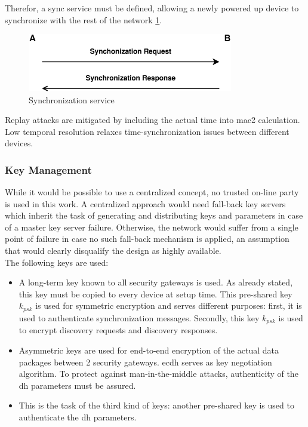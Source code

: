 Therefor, a sync service must be defined, allowing a newly powered up device to synchronize with the rest of the network \ref{fig:syncProt}.
\begin{figure}
  \centering
    \includegraphics[width=0.8\textwidth]{figures/protSync.eps}
 \caption{Synchronization service}
 \label{fig:syncProt}
\end{figure}
Replay attacks are mitigated by including the actual time into \gls{mac2} calculation. Low temporal resolution relaxes time-synchronization issues between
different devices.

\subsubsection{Key Management}

While it would be possible to use a centralized concept, no trusted on-line party is used in this work. A centralized approach would need fall-back key servers
which inherit the task of generating and distributing keys and parameters in case of a master key server failure. Otherwise, the network would suffer from a
single point of failure in case no such fall-back mechanism is applied, an assumption that would clearly disqualify the design as highly available.
\\
The following keys are used:

\begin{itemize}
 \item A long-term key known to all security gateways is used. As already stated, this key must be copied to every device at setup time. 
This pre-shared key $k_{psk}$ is used for symmetric encryption and serves different purposes: first, it is used to authenticate synchronization messages.
Secondly, this key $k_{psk}$ is used to encrypt discovery requests and discovery responses.
 \item Asymmetric keys are used for end-to-end encryption of the actual data packages between 2 security gateways. \gls{ecdh} serves as key negotiation algorithm.
 To protect against man-in-the-middle attacks, authenticity of the \gls{dh} parameters must be assured.
 \item This is the task of the third kind of keys: another pre-shared key is used to authenticate the \gls{dh} parameters.
\end{itemize}


